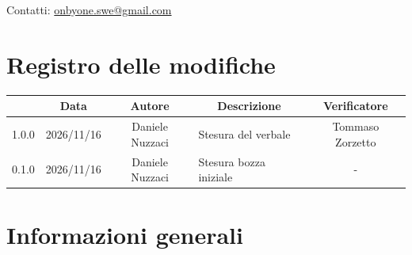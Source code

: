 \documentclass[11pt, a4paper]{article}
\begin{document}
\begin{titlepage}
    \vspace{0.5cm}
    
    {\large Contatti: \href{mailto:onbyone.swe@gmail.com}{onbyone.swe@gmail.com} }
    
\end{titlepage}

\newpage

\section*{Registro delle modifiche}

\vspace{1cm}
\begin{center}
    \renewcommand{\arraystretch}{1.5}
    \begin{tabularx}{\textwidth}{|c|c|c|X|c|}
        \hline
        \rowcolor{gray!10} 
        \multicolumn{1}{|c|}{\textbf{Versione}} & 
        \multicolumn{1}{c|}{\textbf{Data}} & 
        \multicolumn{1}{c|}{\textbf{Autore}} & 
        \multicolumn{1}{c|}{\textbf{Descrizione}} & 
        \multicolumn{1}{c|}{\textbf{Verificatore}} \\
        \hline
        1.0.0 & 2026/11/16 & Daniele Nuzzaci & Stesura del verbale & Tommaso Zorzetto \\
        \hline
        0.1.0 & 2026/11/16 & Daniele Nuzzaci & Stesura bozza iniziale & - \\
        \hline
    \end{tabularx}
\end{center}
\vfill
\newpage

\tableofcontents
\newpage

\section{Informazioni generali}
\end{document}
